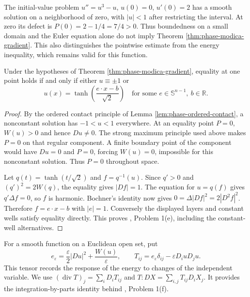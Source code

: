 \begin{example}\label{ex:phase-local-gradient-bound}
The initial-value problem $u''=u^3-u$, $u(0)=0$, $u'(0)=2$ has a smooth solution on a neighborhood of zero, with $|u|<1$ after restricting the interval. At zero its defect is $P(0)=2-1/4=7/4>0$. Thus boundedness on a small domain and the Euler equation alone do not imply Theorem \ref{thm:phase-modica-gradient}. This also distinguishes the pointwise estimate from the energy inequality, which remains valid for this function.
\end{example}

\begin{theorem}\label{thm:phase-modica-equality}
Under the hypotheses of Theorem \ref{thm:phase-modica-gradient}, equality at one point holds if and only if either $u\equiv\pm1$ or
\[
 u(x)=\tanh\left(\frac{e\cdot x-b}{\sqrt2}\right)
 \quad\text{for some }e\in\mathbb S^{n-1},\ b\in\mathbb R.
\]
\end{theorem}
\begin{proof}
By the ordered contact principle of Lemma \ref{lem:phase-ordered-contact}, a nonconstant solution has $-1<u<1$ everywhere. At an equality point $P=0$, $W(u)>0$ and hence $Du\ne0$. The strong maximum principle used above makes $P=0$ on that regular component. A finite boundary point of the component would have $Du=0$ and $P=0$, forcing $W(u)=0$, impossible for this nonconstant solution. Thus $P=0$ throughout space.

Let $q(t)=\tanh(t/\sqrt2)$ and $f=q^{-1}(u)$. Since $q'>0$ and $(q')^2=2W(q)$, the equality gives $|Df|=1$. The equation for $u=q(f)$ gives $q'\Delta f=0$, so $f$ is harmonic. Bochner's identity now gives $0=\Delta|Df|^2=2|D^2f|^2$. Therefore $f=e\cdot x-b$ with $|e|=1$. Conversely the displayed layers and constant wells satisfy equality directly. This proves \cite{ChAC}, Problem 1(e), including the constant-well alternatives.
\end{proof}

\begin{definition}\label{def:phase-stress-energy}
For a smooth function on a Euclidean open set, put
\[
 e_\varepsilon=\frac\varepsilon2|Du|^2+\frac{W(u)}\varepsilon,
 \qquad T_{ij}=e_\varepsilon\delta_{ij}-\varepsilon D_i uD_j u.
\]
This tensor records the response of the energy to changes of the independent variable. We use $(\operatorname{div}T)_j=\sum_iD_iT_{ij}$ and $T:DX=\sum_{i,j}T_{ij}D_iX_j$. It provides the integration-by-parts identity behind \cite{ChAC}, Problem 1(f).
\end{definition}

